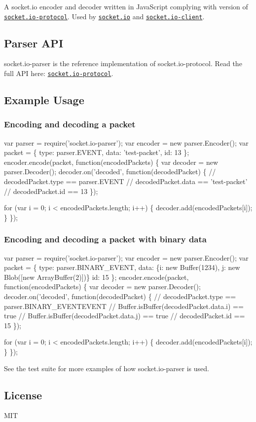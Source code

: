 \href{http://travis-ci.org/socketio/socket.io-parser}{\tt } \href{http://badge.fury.io/js/socket.io-parser}{\tt }

A socket.\+io encoder and decoder written in Java\+Script complying with version {} of \href{https://github.com/socketio/socket.io-protocol}{\tt socket.\+io-\/protocol}. Used by \href{https://github.com/automattic/socket.io}{\tt socket.\+io} and \href{https://github.com/automattic/socket.io-client}{\tt socket.\+io-\/client}.

\subsection*{Parser A\+PI}

socket.\+io-\/parser is the reference implementation of socket.\+io-\/protocol. Read the full A\+PI here\+: \href{https://github.com/learnboost/socket.io-protocol}{\tt socket.\+io-\/protocol}.

\subsection*{Example Usage}

\subsubsection*{Encoding and decoding a packet}


\begin{DoxyCode}
var parser = require('socket.io-parser');
var encoder = new parser.Encoder();
var packet = \{
  type: parser.EVENT,
  data: 'test-packet',
  id: 13
\};
encoder.encode(packet, function(encodedPackets) \{
  var decoder = new parser.Decoder();
  decoder.on('decoded', function(decodedPacket) \{
    // decodedPacket.type == parser.EVENT
    // decodedPacket.data == 'test-packet'
    // decodedPacket.id == 13
  \});

  for (var i = 0; i < encodedPackets.length; i++) \{
    decoder.add(encodedPackets[i]);
  \}
\});
\end{DoxyCode}


\subsubsection*{Encoding and decoding a packet with binary data}


\begin{DoxyCode}
var parser = require('socket.io-parser');
var encoder = new parser.Encoder();
var packet = \{
  type: parser.BINARY\_EVENT,
  data: \{i: new Buffer(1234), j: new Blob([new ArrayBuffer(2)])\}
  id: 15
\};
encoder.encode(packet, function(encodedPackets) \{
  var decoder = new parser.Decoder();
  decoder.on('decoded', function(decodedPacket) \{
    // decodedPacket.type == parser.BINARY\_EVENTEVENT
    // Buffer.isBuffer(decodedPacket.data.i) == true
    // Buffer.isBuffer(decodedPacket.data.j) == true
    // decodedPacket.id == 15
  \});

  for (var i = 0; i < encodedPackets.length; i++) \{
    decoder.add(encodedPackets[i]);
  \}
\});
\end{DoxyCode}
 See the test suite for more examples of how socket.\+io-\/parser is used.

\subsection*{License}

M\+IT 